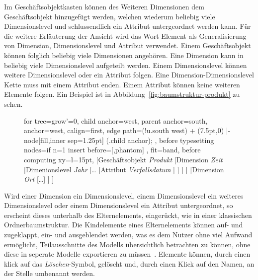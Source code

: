 \documentclass[
  language=german, %
  type=bachelor%
]{isthesis}
\begin{document}
\begin{content}
  Im Geschäftsobjektkasten können des Weiteren Dimensionen dem Geschäftsobjekt
  hinzugefügt werden, welchen wiederum beliebig viele Dimensionslevel und
  schlussendlich ein Attribut untergeordnet werden kann. Für die weitere
  Erläuterung der Ansicht wird das Wort Element als Generalisierung von
  Dimension, Dimensionslevel und Attribut verwendet.  Einem
  Geschäftsobjekt können folglich beliebig viele Dimensionen angehören. Eine
  Dimension kann in beliebig viele Dimensionslevel aufgeteilt werden. Einem
  Dimensionslevel können weitere Dimensionslevel oder ein Attribut folgen. Eine
  Dimension-Dimensionslevel Kette muss mit einem Attribut enden. Einem Attribut
  können keine weiteren Elemente folgen. Ein Beispiel ist in
  Abbildung~\ref{fig:baumstruktur-produkt} zu sehen.

	\begin{figure}[caption={Baumstruktur des Geschäftsobjekts \textit{Produkt}}, label={fig:baumstruktur-produkt}]
		\footnotesize

		\begin{forest}
			for tree={grow'=0,
				child anchor=west,
				parent anchor=south,
				anchor=west,
				calign=first,
				edge path={\noexpand{}
					(!u.south west) + (7.5pt,0) |- node[fill,inner sep=1.25pt] {} (.child anchor);
				},
				before typesetting nodes={if n=1
						{insert before={[,phantom]}}
						{}
				},
				fit=band,
				before computing xy={l=15pt},
			}
		[Geschäftsobjekt \textit{Produkt}
			[Dimension \textit{Zeit}
				[Dimenionslevel \textit{Jahr}
					[\ldots{}
						[Attribut \textit{Verfallsdatum}
						]
					]
				]
			]
			[Dimension \textit{Ort}
				[\ldots{}]
			]
		]
		\end{forest}
	\end{figure}

  Wird einer Dimension ein Dimensionslevel, einem Dimensionslevel ein weiteres
  Dimensionslevel oder einem Dimensionslevel ein Attribut untergeordnet, so
  erscheint dieses unterhalb des Elternelements, eingerückt, wie in einer
  klassischen Ordnerbaumstruktur. Die Kindelemente eines Elternelements können
  auf- und zugeklappt, \bzw{} ein- und ausgeblendet werden, was es dem Nutzer
  ohne viel Aufwand ermöglicht, Teilausschnitte des Modells übersichtlich
  betrachten zu können, ohne diese in seperate Modelle exportieren zu
  müssen~\cite[][S. 6 f.]{fleischer2013konstruktion}.  Elemente können, durch einen klick auf
  das \textit{Löschen}-Symbol, gelöscht und, durch einen Klick auf den Namen, an
  der Stelle umbenannt werden.


\end{content}
\end{document}
